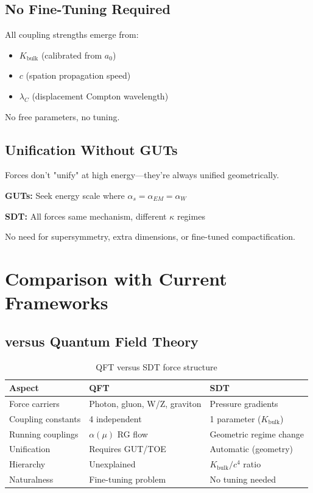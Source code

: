 \subsection{No Fine-Tuning Required}

All coupling strengths emerge from:
\begin{itemize}
\item $K_{\text{bulk}}$ (calibrated from $a_0$)
\item $c$ (spation propagation speed)
\item $\lambda_C$ (displacement Compton wavelength)
\end{itemize}

No free parameters, no tuning.

\subsection{Unification Without GUTs}

Forces don't "unify" at high energy—they're always unified geometrically.

\textbf{GUTs:} Seek energy scale where $\alpha_s = \alpha_{EM} = \alpha_W$

\textbf{SDT:} All forces same mechanism, different $\kappa$ regimes

No need for supersymmetry, extra dimensions, or fine-tuned compactification.

\section{Comparison with Current Frameworks}

\subsection{versus Quantum Field Theory}

\begin{table}[h]
\centering
\begin{tabular}{|l|l|l|}
\hline
\textbf{Aspect} & \textbf{QFT} & \textbf{SDT} \\
\hline
Force carriers & Photon, gluon, W/Z, graviton & Pressure gradients \\
Coupling constants & 4 independent & 1 parameter ($K_{\text{bulk}}$) \\
Running couplings & $\alpha(\mu)$ RG flow & Geometric regime change \\
Unification & Requires GUT/TOE & Automatic (geometry) \\
Hierarchy & Unexplained & $K_{\text{bulk}}/c^4$ ratio \\
Naturalness & Fine-tuning problem & No tuning needed \\
\hline
\end{tabular}
\caption{QFT versus SDT force structure}
\end{table}

